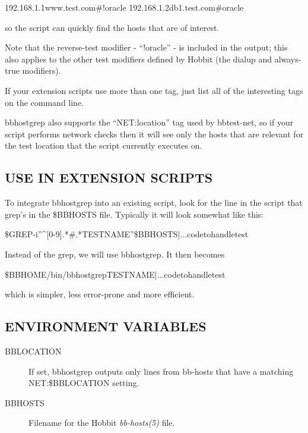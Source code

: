   
192.168.1.1www.test.com\#!oracle  
192.168.1.2db1.test.com\#oracle 


  so the script can quickly find the hosts that are of interest. 


  Note that the reverse-test modifier - ``!oracle'' - is included in
  the output; this also applies to the other test modifiers defined by
  Hobbit (the dialup and always-true modifiers). 



  If your extension scripts use more than one tag, just list all of
  the interesting tags on the command line. 



  bbhostgrep also supports the ``NET:location'' tag used by
  bbtest-net, so if your script performs network checks then it will
  see only the hosts that are relevant for the test location that the
  script currently executes on. 



 
\subsection{USE IN EXTENSION SCRIPTS}
 To integrate bbhostgrep into an existing script, look for the line in the script that grep's in the \$BBHOSTS file. Typically it will look somewhat like this: 

  
\$GREP-i''\^{}[0-9].*\#.*TESTNAME''\$BBHOSTS|...codetohandletest 


  Instead of the grep, we will use bbhostgrep. It then becomes 


  
\$BBHOME/bin/bbhostgrepTESTNAME|...codetohandletest 


  which is simpler, less error-prone and more efficient. 


 
\subsection{ENVIRONMENT VARIABLES}
\begin{description}
\item[BBLOCATION] If set, bbhostgrep outputs only lines from bb-hosts that have a matching NET:\$BBLOCATION setting. 

 

\item[BBHOSTS] Filename for the Hobbit \emph{bb-hosts(5)}
 file. 

 


\end{description}
